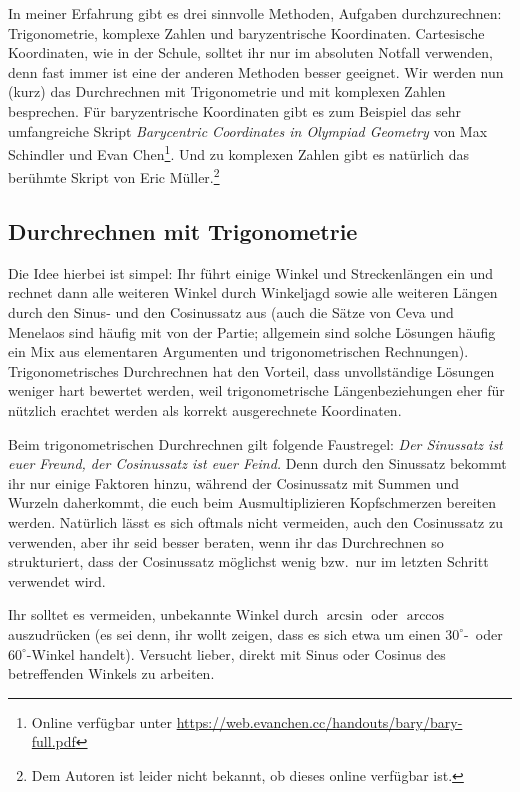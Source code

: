 In meiner Erfahrung gibt es drei sinnvolle Methoden, Aufgaben durchzurechnen: Trigonometrie, komplexe Zahlen und baryzentrische Koordinaten. Cartesische Koordinaten,
wie in der Schule, solltet ihr nur im absoluten Notfall verwenden, denn fast immer ist eine der anderen Methoden besser geeignet. Wir werden nun (kurz) das Durchrechnen mit Trigonometrie und mit komplexen Zahlen besprechen. Für baryzentrische Koordinaten gibt es zum Beispiel das sehr umfangreiche Skript \emph{Barycentric Coordinates in Olympiad Geometry} von Max Schindler und Evan Chen\footnote{Online verfügbar unter \url{https://web.evanchen.cc/handouts/bary/bary-full.pdf}}. Und zu komplexen Zahlen gibt es natürlich das berühmte Skript von Eric Müller.\footnote{Dem Autoren ist leider nicht bekannt, ob dieses online verfügbar ist.}

\subsection*{Durchrechnen mit Trigonometrie}
Die Idee hierbei ist simpel: Ihr führt einige Winkel und Streckenlängen ein und rechnet dann alle weiteren Winkel durch Winkeljagd sowie alle weiteren Längen durch den Sinus- und den Cosinussatz aus (auch die Sätze von Ceva und Menelaos sind häufig mit von der Partie; allgemein sind solche Lösungen häufig ein Mix aus elementaren Argumenten und trigonometrischen Rechnungen). Trigonometrisches Durchrechnen hat den Vorteil, dass unvollständige Lösungen weniger hart bewertet werden, weil trigonometrische Längenbeziehungen eher für nützlich erachtet werden als korrekt ausgerechnete Koordinaten.

Beim trigonometrischen Durchrechnen gilt folgende Faustregel: \emph{Der Sinussatz ist euer Freund, der Cosinussatz ist euer Feind.} Denn durch den Sinussatz bekommt ihr nur einige Faktoren hinzu, während der Cosinussatz mit Summen und Wurzeln daherkommt, die euch beim Ausmultiplizieren Kopfschmerzen bereiten werden. Natürlich lässt es sich oftmals nicht vermeiden, auch den Cosinussatz zu verwenden, aber ihr seid besser beraten, wenn ihr das Durchrechnen so strukturiert, dass der Cosinussatz möglichst wenig bzw.\ nur im letzten Schritt verwendet wird.

Ihr solltet es vermeiden, unbekannte Winkel durch $\arcsin$ oder $\arccos$ auszudrücken (es sei denn, ihr wollt zeigen, dass es sich etwa um einen $30^\circ$-~oder $60^\circ$-Winkel handelt). Versucht lieber, direkt mit Sinus oder Cosinus des betreffenden Winkels zu arbeiten.

